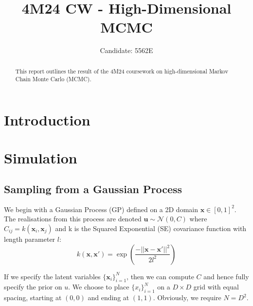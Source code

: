 \documentclass[]{article}
\title{4M24 CW - High-Dimensional MCMC}
\author{Candidate: 5562E}
\newcommand{\Ncal}{\mathcal{N}}
\newcommand{\xbold}{\boldsymbol{x}}
\newcommand{\ubold}{\boldsymbol{u}}
\begin{document}


\setcounter{page}{1}
\maketitle

\begin{abstract}
	This report outlines the result of the 4M24 coursework on high-dimensional Markov Chain Monte Carlo (MCMC).
\end{abstract}

\tableofcontents

\section{Introduction}

\section{Simulation}
\subsection{Sampling from a Gaussian Process}

We begin with a Gaussian Process (GP) defined on a 2D domain $\xbold \in [0, 1]^2$. The realisations from this process are denoted $\ubold \sim \Ncal(0, C)$ where $C_{ij} = k(\xbold_i, \xbold_j)$ and k is the Squared Exponential (SE) covariance function with length parameter $l$:
%
\begin{equation}
	k(\xbold, \xbold ') = \exp \left( \frac{-||\xbold - \xbold '||^2}{2l^2}\right)
	\label{eqn:k-defn}
\end{equation}

If we specify the latent variables $\{\xbold_i\}_{i=1}^N$, then we can compute $C$ and hence fully specify the prior on $u$. We choose to place $\{x_i\}_{i=1}^N$ on a $D \times D$ grid with equal spacing, starting at $(0,0)$ and ending at $(1,1)$. Obviously, we require $N = D^2$.
\end{document}
